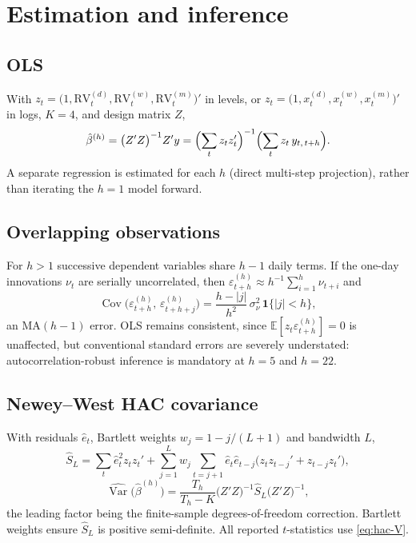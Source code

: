 \documentclass[11pt,a4paper]{article}
\newcommand{\RV}{\mathrm{RV}}
\newcommand{\E}{\mathbb{E}}
\newcommand{\Var}{\operatorname{Var}}
\newcommand{\Cov}{\operatorname{Cov}}
\begin{document}
\section{Estimation and inference}
\label{sec:estimation}

\subsection{OLS}

With $z_t=\bigl(1,\RV^{(d)}_t,\RV^{(w)}_t,\RV^{(m)}_t\bigr)'$ in levels, or
$z_t=\bigl(1,x^{(d)}_t,x^{(w)}_t,x^{(m)}_t\bigr)'$ in logs, $K=4$, and design matrix $Z$,
\begin{equation}
  \hat\beta^{(h)}=\bigl(Z'Z\bigr)^{-1}Z'y
  =\Bigl(\sum_t z_t z_t'\Bigr)^{-1}\Bigl(\sum_t z_t\,y_{t,\,t+h}\Bigr).
  \label{eq:ols}
\end{equation}
A separate regression is estimated for each $h$ (direct multi-step projection), rather than
iterating the $h=1$ model forward.

\subsection{Overlapping observations}

For $h>1$ successive dependent variables share $h-1$ daily terms. If the one-day innovations
$\nu_t$ are serially uncorrelated, then
$\varepsilon^{(h)}_{t+h}\approx h^{-1}\sum_{i=1}^{h}\nu_{t+i}$ and
\begin{equation}
  \Cov\bigl(\varepsilon^{(h)}_{t+h},\,\varepsilon^{(h)}_{t+h+j}\bigr)
  =\frac{h-|j|}{h^{2}}\,\sigma_\nu^{2}\,\mathbf{1}\{|j|<h\},
  \label{eq:ma}
\end{equation}
an $\mathrm{MA}(h-1)$ error. OLS remains consistent, since
$\E[z_t\varepsilon^{(h)}_{t+h}]=0$ is unaffected, but conventional standard errors are
severely understated: autocorrelation-robust inference is mandatory at $h=5$ and $h=22$.

\subsection{Newey--West HAC covariance}

With residuals $\hat e_t$, Bartlett weights $w_j=1-j/(L+1)$ and bandwidth $L$,
\begin{equation}
  \hat S_L=\sum_{t}\hat e_t^{2}z_tz_t'
  +\sum_{j=1}^{L}w_j\sum_{t=j+1}\hat e_t\hat e_{t-j}\bigl(z_tz_{t-j}'+z_{t-j}z_t'\bigr),
  \label{eq:hac-S}
\end{equation}
\begin{equation}
  \widehat{\Var}\bigl(\hat\beta^{(h)}\bigr)
  =\frac{T_h}{T_h-K}\bigl(Z'Z\bigr)^{-1}\hat S_L\bigl(Z'Z\bigr)^{-1},
  \label{eq:hac-V}
\end{equation}
the leading factor being the finite-sample degrees-of-freedom correction. Bartlett weights
ensure $\hat S_L$ is positive semi-definite. All reported $t$-statistics use
\eqref{eq:hac-V}.
\end{document}
